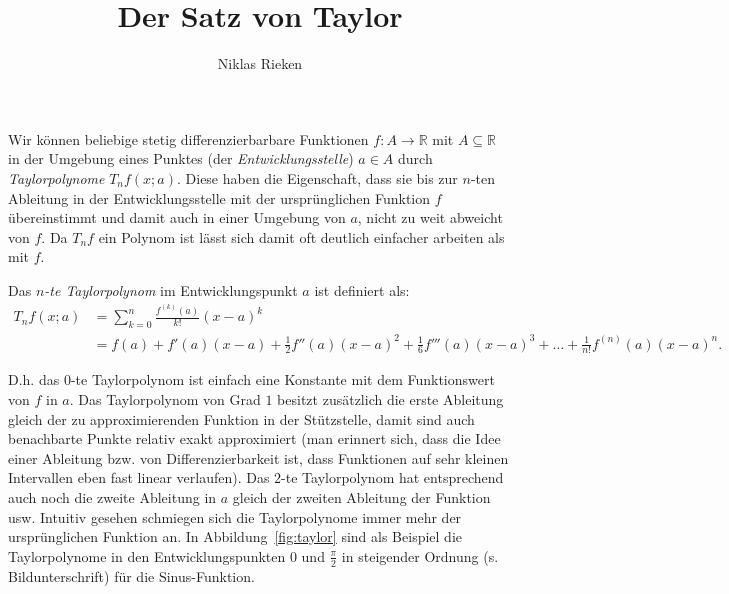 \documentclass[12pt]{article}
\title{Der Satz von Taylor}
\author{Niklas Rieken}
\begin{document}
\maketitle

Wir können beliebige stetig differenzierbarbare Funktionen $f\colon A \to \mathbb{R}$ mit $A \subseteq \mathbb{R}$ in der Umgebung eines Punktes (der \emph{Entwicklungsstelle}) $a \in A$ durch \emph{Taylorpolynome} $T_nf(x; a)$. Diese haben die Eigenschaft, dass sie bis zur $n$-ten Ableitung in der Entwicklungsstelle mit der ursprünglichen Funktion $f$ übereinstimmt und damit auch in einer Umgebung von $a$, nicht zu weit abweicht von $f$. Da $T_nf$ ein Polynom ist lässt sich damit oft deutlich einfacher arbeiten als mit $f$.

Das \emph{$n$-te Taylorpolynom} im Entwicklungspunkt $a$ ist definiert als:
\begin{align*}
	T_nf(x; a) &= \sum_{k=0}^n \frac{f^{(k)}(a)}{k!} (x-a)^k\\
	&= f(a) + f'(a) (x-a) + \tfrac{1}{2} f''(a) (x-a)^2 + \tfrac{1}{6} f'''(a) (x-a)^3 + \ldots + \tfrac{1}{n!} f^{(n)}(a) (x-a)^n.
\end{align*}

D.h. das $0$-te Taylorpolynom ist einfach eine Konstante mit dem Funktionswert von $f$ in $a$. Das Taylorpolynom von Grad $1$ besitzt zusätzlich die erste Ableitung gleich der zu approximierenden Funktion in der Stützstelle, damit sind auch benachbarte Punkte relativ exakt approximiert (man erinnert sich, dass die Idee einer Ableitung bzw. von Differenzierbarkeit ist, dass Funktionen auf sehr kleinen Intervallen eben fast linear verlaufen). Das $2$-te Taylorpolynom hat entsprechend auch noch die zweite Ableitung in $a$ gleich der zweiten Ableitung der Funktion usw. Intuitiv gesehen schmiegen sich die Taylorpolynome immer mehr der ursprünglichen Funktion an.
In Abbildung~\ref{fig:taylor} sind als Beispiel die Taylorpolynome in den Entwicklungspunkten $0$ und $\frac{\pi}{2}$ in steigender Ordnung (s. Bildunterschrift) für die Sinus-Funktion.
\end{document}
